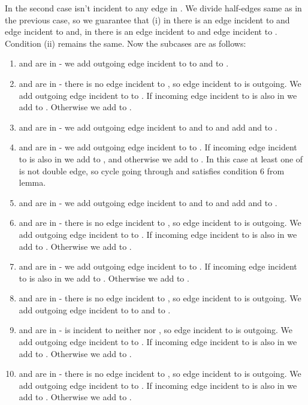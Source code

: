 \documentclass[a4, 11pt]{article}
\newcommand{\<}{\langle}
\renewcommand{\>}{\rangle}
\begin{document}
In the second case  isn't incident to any edge in . We divide half-edges same as in the previous case, so we guarantee that (i) in  there is an edge incident to  and edge incident to  and, in  there is an edge incident to  and edge incident to . Condition (ii) remains the same. Now the subcases are as follows:
\begin{enumerate}
	\item  and  are in  - we add outgoing edge incident to  to  and  to .
	\item  and  are in  - there is no edge incident to , so edge incident to  is outgoing. We add outgoing edge incident to  to . If incoming edge incident to  is also in  we add  to . Otherwise we add  to .
	\item  and  are in  - we add outgoing edge incident to  and  to  and add  and  to .
	\item  and  are in  - we add outgoing edge incident to  to . If incoming edge incident to  is also in  we add  to , and otherwise we add  to . In this case at least one of  is not double edge, so cycle going through  and  satisfies condition 6 from lemma.
	\item  and  are in  - we add outgoing edge incident to  and  to  and add  and  to .
	\item  and  are in  - there is no edge incident to , so edge incident to  is outgoing. We add outgoing edge incident to  to . If incoming edge incident to  is also in  we add  to . Otherwise we add  to .
	\item  and  are in  - we add outgoing edge incident to  to . If incoming edge incident to  is also in  we add  to . Otherwise we add  to .
	\item  and  are in  - there is no edge incident to , so edge incident to  is outgoing. We add outgoing edge incident to  to  and  to .
	\item  and  are in  -  is incident to neither  nor , so edge incident to  is outgoing. We add outgoing edge incident to  to . If incoming edge incident to  is also in  we add  to . Otherwise we add  to .
	\item  and  are in  - there is no edge incident to , so edge incident to  is outgoing. We add outgoing edge incident to  to . If incoming edge incident to  is also in  we add  to . Otherwise we add  to .
\end{enumerate}
\end{document}
